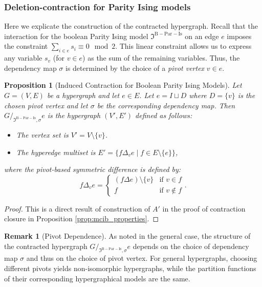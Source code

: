 \documentclass[11pt,reqno]{amsart}
\newcommand{\mcib}{\mathfrak{I}^{\mathrm{B-Par-Is}}}
\theoremstyle{plain}
\newtheorem{proposition}[theorem]{Proposition}
\theoremstyle{definition}
\newtheorem{remark}[theorem]{Remark}
\numberwithin{equation}{section}
\begin{document}
\subsubsection{Deletion-contraction for Parity Ising models}
Here we explicate the construction of the contracted hypergraph. Recall that the interaction for the boolean Parity Ising model $\mcib$ on an edge $e$ imposes the constraint $\sum_{i \in e} s_i \equiv 0 \mod 2$. This linear constraint allows us to express any variable $s_v$ (for $v \in e$) as the sum of the remaining variables. Thus, the dependency map $\sigma$ is determined by the choice of a \emph{pivot vertex} $v \in e$.

\begin{proposition}[Induced Contraction for Boolean Parity Ising Models]
    \label{def:parity_contraction}
    Let $G = (V, E)$ be a hypergraph and let $e \in E$. Let $e = I \sqcup D$ where $D = \{v\}$ is the chosen pivot vertex and let $\sigma$ be the corresponding dependency map. Then $G/_{ \mcib, \sigma}e$ is the hypergraph $(V', E')$ defined as follows:
    \begin{itemize}
        \item The vertex set is $V' = V \setminus \{v\}$.
        \item The hyperedge multiset is $E' = \{ f \Delta_v e \mid f \in E \setminus \{e\} \}$,
    \end{itemize}
    where the \emph{pivot-based symmetric difference} is defined by:
    \[
    f \Delta_v e = \begin{cases}
        (f \Delta e) \setminus \{v\} & \text{if } v \in f \\
        f & \text{if } v \notin f
    \end{cases}.
    \]
\end{proposition}
\begin{proof}
    This is a direct result of construction of $A'$ in the proof of contraction closure in Proposition \ref{prop:mcib_properties}.
\end{proof}

\begin{remark}[Pivot Dependence]
    As noted in the general case, the structure of the contracted hypergraph $G/_{ \mcib, \sigma}e$ depends on the choice of dependency map $\sigma$ and thus on the choice of pivot vertex. For general hypergraphs, choosing different pivots yields non-isomorphic hypergraphs, while the partition functions of their corresponding hypergraphical models are the same.
\end{remark}
\end{document}

